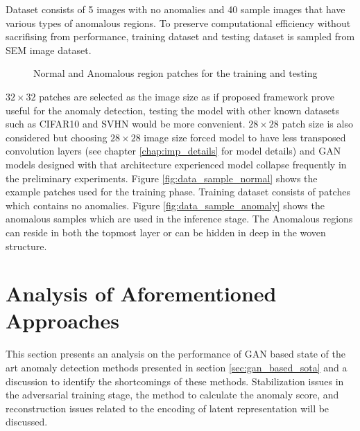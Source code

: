 Dataset consists of 5 images with no anomalies and 40 sample images that have various types of
anomalous regions. To preserve computational efficiency without sacrifising from performance,
training dataset and testing dataset is sampled from SEM image dataset.
\begin{figure}[h!] 
	\hspace*{\fill} 
	\caption{Normal and Anomalous region patches for the training and testing}
	\label{fig:data_samples}
\end{figure}

$32 \times 32$ patches are selected as the image size as if proposed framework prove useful for the
anomaly detection, testing the model with other known datasets such as CIFAR10 \cite{cifar10} and
SVHN \cite{Netzer2011ReadingDI} would be more convenient. $28 \times 28$ patch size is also
considered but choosing $28 \times 28$ image size forced model to have less transposed convolution
layers (see chapter \ref{chap:imp_details} for model details) and GAN models designed with that
architecture experienced model collapse frequently in the preliminary experiments. Figure
\ref{fig:data_sample_normal} shows the example patches used for the training phase. Training dataset
consists of patches which contains no anomalies. Figure \ref{fig:data_sample_anomaly} shows the
anomalous samples which are used in the inference stage. The Anomalous regions can reside in both
the topmost layer or can be hidden in deep in the woven structure.

\section{Analysis of Aforementioned Approaches}
\label{sec:analysis_before}

This section presents an analysis on the performance of GAN based state of the art anomaly detection
methods presented in section \ref{sec:gan_based_sota} and a discussion to identify the shortcomings
of these methods. Stabilization issues in the adversarial training stage, the method to calculate
the anomaly score, and reconstruction issues related to the encoding of latent representation will
be discussed.

